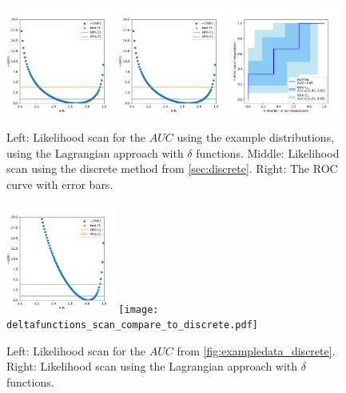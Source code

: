 \documentclass[11pt]{article}
\newcommand{\AUC}{AUC}
\begin{document}
\begin{figure}
\begin{center}
\includegraphics[width=0.32\textwidth]{deltafunctions_scan.pdf}
\includegraphics[width=0.32\textwidth]{discrete_scan_compare_to_delta_functions.pdf}
\includegraphics[width=0.32\textwidth]{deltafunctions_exampleroc_errors.pdf}
\caption{Left: Likelihood scan for the \(\AUC\) using the example distributions, using the Lagrangian approach with \(\delta\) functions.  Middle: Likelihood scan using the discrete method from \cref{sec:discrete}.  Right: The ROC curve with error bars.}
\label{fig:exampledata_delta_functions_agreement}
\end{center}
\end{figure}

\begin{figure}
\begin{center}
\includegraphics[width=0.32\textwidth]{discrete_scan.pdf}
\texttt{[image: deltafunctions\_scan\_compare\_to\_discrete.pdf]}
\caption{Left: Likelihood scan for the \(\AUC\) from \cref{fig:exampledata_discrete}.  Right: Likelihood scan using the Lagrangian approach with \(\delta\) functions.}
\label{fig:exampledata_delta_functions_disagreement}
\end{center}
\end{figure}
\end{document}
